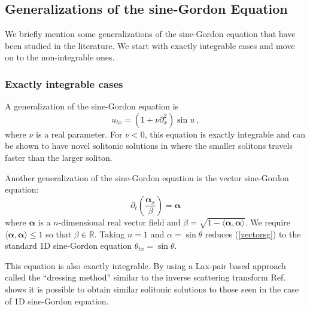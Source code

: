 \documentclass[11pt]{book}
\begin{document}
\subsection{Generalizations of the sine-Gordon Equation}
We briefly mention some generalizations of the sine-Gordon equation that have been studied in the literature. We start with exactly integrable cases and move on to the non-integrable ones.

\subsubsection{Exactly integrable cases}
A generalization of the sine-Gordon equation is \cite{1751-8121-43-10-105204}
\begin{equation}
  u_{tx} = (1+\nu \partial^2_x)\sin u\,,
\end{equation}
where $\nu$ is a real parameter. For $\nu<0$, this equation is exactly integrable and can be shown to have novel solitonic solutions in \cite{1751-8121-43-10-105204} where the smaller solitons travels faster than the larger soliton.

\medbreak
Another  generalization of the sine-Gordon equation is the vector sine-Gordon equation:
\begin{equation}\label{vectorsg}
  \partial_t\left(\frac{\bm{\alpha}_x}{\beta}\right) = \bm{\alpha}
\end{equation}
where $\bm{\alpha}$ is a $n$-dimensional real vector field and $\beta = \sqrt{1 - \langle\bm{\alpha},\bm{\alpha}\rangle}$. We require $\langle\bm{\alpha},\bm{\alpha}\rangle\le1$ so that $\beta\in\mathbb{R}$. Taking $n=1$ and $\alpha = \sin \theta$ reduces (\ref{vectorsg}) to the standard 1D sine-Gordon equation $\theta_{tx} = \sin \theta$.

This equation is also exactly integrable. By using a Lax-pair based approach called the ``dressing method'' similar to the inverse scattering transform Ref.~\cite{Mikhailov201653} shows it is possible to obtain similar solitonic solutions to those seen in the case of 1D sine-Gordon equation.
\end{document}

